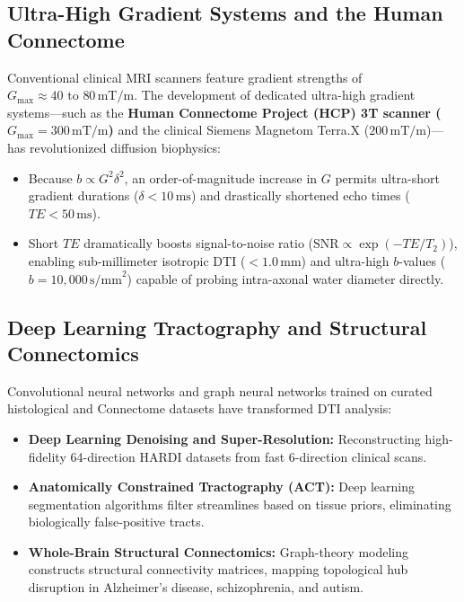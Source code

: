\documentclass[11pt,a4paper]{article}
\begin{document}
\subsection{Ultra-High Gradient Systems and the Human Connectome}

Conventional clinical MRI scanners feature gradient strengths of $G_{\text{max}} \approx 40\text{ to }80\,\text{mT/m}$. The development of dedicated ultra-high gradient systems—such as the \textbf{Human Connectome Project (HCP) 3T scanner ($G_{\text{max}} = 300\,\text{mT/m}$)} and the clinical Siemens Magnetom Terra.X ($200\,\text{mT/m}$)—has revolutionized diffusion biophysics:
\begin{itemize}[leftmargin=*]
    \item Because $b \propto G^2 \delta^2$, an order-of-magnitude increase in $G$ permits ultra-short gradient durations ($\delta < 10\,\text{ms}$) and drastically shortened echo times ($TE < 50\,\text{ms}$).
    \item Short $TE$ dramatically boosts signal-to-noise ratio ($\text{SNR} \propto \exp(-TE/T_2)$), enabling sub-millimeter isotropic DTI ($< 1.0\,\text{mm}$) and ultra-high $b$-values ($b = 10{,}000\,\text{s/mm}^2$) capable of probing intra-axonal water diameter directly.
\end{itemize}

\subsection{Deep Learning Tractography and Structural Connectomics}

Convolutional neural networks and graph neural networks trained on curated histological and Connectome datasets have transformed DTI analysis:
\begin{itemize}[leftmargin=*]
    \item \textbf{Deep Learning Denoising and Super-Resolution:} Reconstructing high-fidelity 64-direction HARDI datasets from fast 6-direction clinical scans.
    \item \textbf{Anatomically Constrained Tractography (ACT):} Deep learning segmentation algorithms filter streamlines based on tissue priors, eliminating biologically false-positive tracts.
    \item \textbf{Whole-Brain Structural Connectomics:} Graph-theory modeling constructs structural connectivity matrices, mapping topological hub disruption in Alzheimer's disease, schizophrenia, and autism.
\end{itemize}
\end{document}
